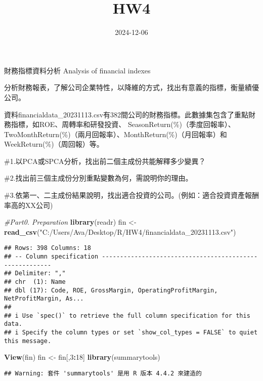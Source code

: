 \documentclass[
]{article}
\title{HW4}
\author{}
\date{\vspace{-2.5em}2024-12-06}
\newenvironment{Shaded}{\begin{snugshade}}{\end{snugshade}}
\newcommand{\CommentTok}[1]{\textcolor[rgb]{0.56,0.35,0.01}{\textit{#1}}}
\newcommand{\DecValTok}[1]{\textcolor[rgb]{0.00,0.00,0.81}{#1}}
\newcommand{\FunctionTok}[1]{\textcolor[rgb]{0.13,0.29,0.53}{\textbf{#1}}}
\newcommand{\NormalTok}[1]{#1}
\newcommand{\OtherTok}[1]{\textcolor[rgb]{0.56,0.35,0.01}{#1}}
\newcommand{\SpecialCharTok}[1]{\textcolor[rgb]{0.81,0.36,0.00}{\textbf{#1}}}
\newcommand{\StringTok}[1]{\textcolor[rgb]{0.31,0.60,0.02}{#1}}
\begin{document}
\maketitle

財務指標資料分析 Analysis of financial indexes

分析財務報表，了解公司企業特性，以降維的方式，找出有意義的指標，衡量績優公司。

資料financialdata\_20231113.csv有382間公司的財務指標。此數據集包含了重點財務指標，如ROE、周轉率和研發投資、
SeasonReturn(\%)（季度回報率）、TwoMonthReturn(\%)（兩月回報率）、MonthReturn(\%)（月回報率）和
WeekReturn(\%)（周回報）等。

\#1.以PCA或SPCA分析，找出前二個主成份共能解釋多少變異？

\#2.找出前三個主成份分別重點變數為何，需說明你的理由。

\#3.依第一、二主成份結果說明，找出適合投資的公司。(例如：適合投資資產報酬率高的XX公司)

\begin{Shaded}
\begin{Highlighting}[]
\CommentTok{\#Part0. Preparation}
\FunctionTok{library}\NormalTok{(readr)}
\NormalTok{fin }\OtherTok{\textless{}{-}} \FunctionTok{read\_csv}\NormalTok{(}\StringTok{"C:/Users/Ava/Desktop/R/HW4/financialdata\_20231113.csv"}\NormalTok{)}
\end{Highlighting}
\end{Shaded}

\begin{verbatim}
## Rows: 398 Columns: 18
## -- Column specification --------------------------------------------------------
## Delimiter: ","
## chr  (1): Name
## dbl (17): Code, ROE, GrossMargin, OperatingProfitMargin, NetProfitMargin, As...
## 
## i Use `spec()` to retrieve the full column specification for this data.
## i Specify the column types or set `show_col_types = FALSE` to quiet this message.
\end{verbatim}

\begin{Shaded}
\begin{Highlighting}[]
\FunctionTok{View}\NormalTok{(fin)}
\NormalTok{fin }\OtherTok{\textless{}{-}}\NormalTok{ fin[,}\DecValTok{3}\SpecialCharTok{:}\DecValTok{18}\NormalTok{]}
\FunctionTok{library}\NormalTok{(summarytools)}
\end{Highlighting}
\end{Shaded}

\begin{verbatim}
## Warning: 套件 'summarytools' 是用 R 版本 4.4.2 來建造的
\end{verbatim}
\end{document}
